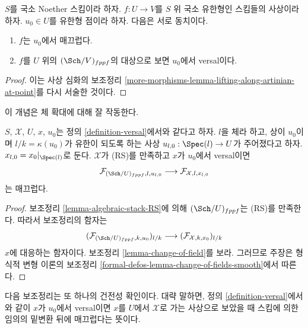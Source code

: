 \begin{lemma}
\label{lemma-versal-implies-smooth}
$S$를 국소 Noether 스킴이라 하자. $f : U \to V$를 $S$ 위 국소 유한형인
스킴들의 사상이라 하자. $u_0 \in U$를 유한형 점이라 하자.
다음은 서로 동치이다.
\begin{enumerate}
\item $f$는 $u_0$에서 매끄럽다.
\item $f$를 $U$ 위의 $(\Sch/V)_{fppf}$의 대상으로 보면
$u_0$에서 versal이다.
\end{enumerate}
\end{lemma}

\begin{proof}
이는 사상 심화의 보조정리
\ref{more-morphisms-lemma-lifting-along-artinian-at-point}를 다시
서술한 것이다.
\end{proof}

\noindent
이 개념은 체 확대에 대해 잘 작동한다.

\begin{lemma}
\label{lemma-versal-change-of-field}
$S$, $\mathcal{X}$, $U$, $x$, $u_0$는 정의 \ref{definition-versal}에서와
같다고 하자. $l$을 체라 하고, 상이 $u_0$이며
$l/k = \kappa(u_0)$가 유한이 되도록 하는 사상
$u_{l, 0} : \Spec(l) \to U$가 주어졌다고 하자.
$x_{l, 0} = x_0|_{\Spec(l)}$로 둔다.
$\mathcal{X}$가 (RS)를 만족하고 $x$가 $u_0$에서 versal이면
$$
\mathcal{F}_{(\Sch/U)_{fppf}, l, u_{l, 0}}
\longrightarrow
\mathcal{F}_{\mathcal{X}, l, x_{l, 0}}
$$
는 매끄럽다.
\end{lemma}

\begin{proof}
보조정리 \ref{lemma-algebraic-stack-RS}에 의해
$(\Sch/U)_{fppf}$는 (RS)를 만족한다. 따라서 보조정리의 함자는
$$
(\mathcal{F}_{(\Sch/U)_{fppf}, k , u_0})_{l/k}
\longrightarrow
(\mathcal{F}_{\mathcal{X}, k , x_0})_{l/k}
$$
$\hat x$에 대응하는 함자이다. 보조정리 \ref{lemma-change-of-field}를 보라.
그러므로 주장은 형식적 변형 이론의 보조정리
\ref{formal-defos-lemma-change-of-fields-smooth}에서 따른다.
\end{proof}

\noindent
다음 보조정리는 또 하나의 건전성 확인이다. 대략 말하면, 정의
\ref{definition-versal}에서와 같이 $x$가 $u_0$에서 versal이면
$x$를 $U$에서 $\mathcal{X}$로 가는 사상으로 보았을 때 스킴에 의한
임의의 밑변환 뒤에 매끄럽다는 뜻이다.

